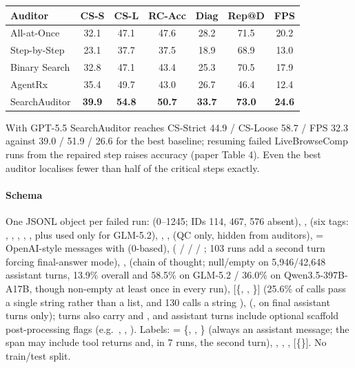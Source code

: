 \begin{center}\small\setlength{\tabcolsep}{3.5pt}
\begin{tabular}{@{}lcccccc@{}}\toprule
Auditor & CS-S & CS-L & RC-Acc & Diag & Rep@D & FPS\\\midrule
All-at-Once & 32.1 & 47.1 & 47.6 & 28.2 & 71.5 & 20.2\\
Step-by-Step & 23.1 & 37.7 & 37.5 & 18.9 & 68.9 & 13.0\\
Binary Search & 32.8 & 47.1 & 43.4 & 25.3 & 70.5 & 17.9\\
AgentRx & 35.4 & 49.7 & 43.0 & 26.7 & 46.4 & 12.4\\
SearchAuditor & \textbf{39.9} & \textbf{54.8} & \textbf{50.7} & \textbf{33.7} & \textbf{73.0} & \textbf{24.6}\\\bottomrule
\end{tabular}
\end{center}
With GPT-5.5 SearchAuditor reaches CS-Strict 44.9 / CS-Loose 58.7 / FPS 32.3 against 39.0 / 51.9 / 26.6 for the best baseline; resuming failed LiveBrowseComp runs from the repaired step raises accuracy (paper Table 4). Even the best auditor localises fewer than half of the critical steps exactly.

\paragraph{Schema} One JSONL object per failed run:  (0--1245; IDs 114, 467, 576 absent), ,  (six tags: , , , , , plus  used only for GLM-5.2), , ,  (QC only, hidden from auditors),  = OpenAI-style messages with  (0-based),  ( /  /  / ; 103 runs add a second  turn forcing final-answer mode), ,  (chain of thought; null/empty on 5,946/42,648 assistant turns, 13.9\% overall and 58.5\% on GLM-5.2 / 36.0\% on Qwen3.5-397B-A17B, though non-empty at least once in every run),  [\{, , \}] (25.6\% of  calls pass a single string  rather than a list, and 130  calls a string ),  (, on final assistant turns only);  turns also carry  and , and assistant turns include optional scaffold post-processing flags (e.g.\ , , ). Labels:  = \{, , \} (always an assistant message; the span may include tool returns and, in 7 runs, the second  turn), , , ,  [\{\}]. No train/test split.

